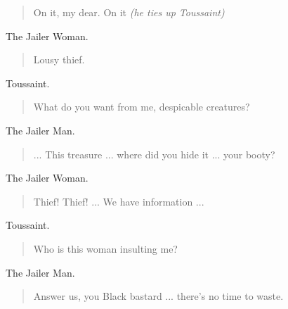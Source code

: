 \documentclass[letterpaper,article,12pt,oneside,notitlepage]{memoir}
\begin{document}
\begin{verse}
On it, my dear. On it \textit{(he ties up Toussaint)} \\
\end{verse}

\begin{center}The Jailer Woman.\end{center}

\begin{verse}
Lousy thief. \\
\end{verse}

\begin{center}Toussaint.\end{center}

\begin{verse}
What do you want from me, despicable creatures? \\
\end{verse}

\begin{center}The Jailer Man.\end{center}

\begin{verse}
... This treasure ... where did you hide it ... your booty? \\
\end{verse}

\begin{center}The Jailer Woman.\end{center}

\begin{verse}
Thief! Thief! ... We have information ... \\
\end{verse}

\begin{center}Toussaint.\end{center}

\begin{verse}
Who is this woman insulting me? \\
\end{verse}

\clearpage

\begin{center}The Jailer Man.\end{center}

\begin{verse}
Answer us, you Black bastard ... there's no time to waste. \\
\end{verse}
\end{document}
